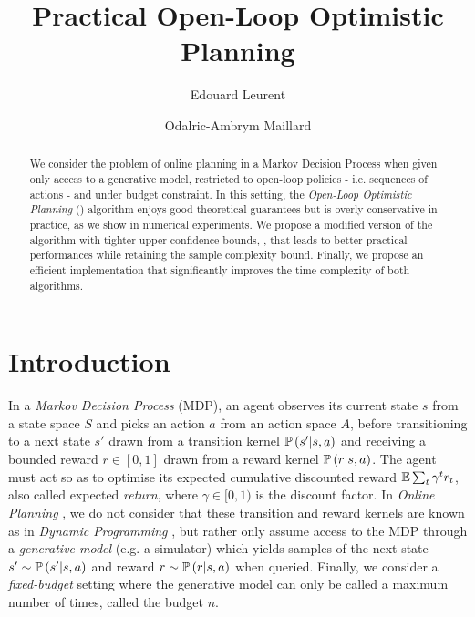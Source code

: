 \documentclass[runningheads]{llncs}
\newcommand{\citep}{\cite}
\begin{document}
%
\title{Practical Open-Loop Optimistic Planning}
%
%
\author{Edouard Leurent\and
Odalric-Ambrym Maillard}
%
%
%
\maketitle              %
%

\begin{abstract}
    We consider the problem of online planning in a Markov Decision Process when given only access to a generative model, restricted to open-loop policies - i.e. sequences of actions - and under budget constraint. In this setting, the \textit{Open-Loop Optimistic Planning} (\OLOP) algorithm enjoys good theoretical guarantees but is overly conservative in practice, as we show in numerical experiments. We propose a modified version of the algorithm with tighter upper-confidence bounds, \KLOLOP, that leads to better practical performances while retaining the sample complexity bound. Finally, we propose an efficient implementation that significantly improves the time complexity of both algorithms.
    
\end{abstract}

\section{Introduction}

In a \emph{Markov Decision Process} (MDP), an agent observes its current state $s$ from a state space $S$ and picks an action $a$ from an action space $A$, before transitioning to a next state $s'$ drawn from a transition kernel $\mathbb{P}\left(s'|s,a\right)$ and receiving a bounded reward $r\in[0, 1]$ drawn from a reward kernel $\mathbb{P}\left(r|s, a\right)$. The agent must act so as to optimise its expected cumulative discounted reward $\operatorname*{\mathbb{E}} \sum_t \gamma^t r_t$, also called expected \emph{return}, where $\gamma\in[0,1)$ is the discount factor. In \emph{Online Planning} \cite{Munos2014}, we do not consider that these transition and reward kernels are known as in \emph{Dynamic Programming} \citep{Bellman1957}, but rather only assume access to the MDP through a \emph{generative model} (e.g. a simulator) which yields samples of the next state $s' \sim \mathbb{P}\left(s'|s,a\right)$ and reward $r\sim\mathbb{P}\left(r|s, a\right)$ when queried. Finally, we consider a \emph{fixed-budget} setting where the generative model can only be called a maximum number of times, called the budget $n$. 
\end{document}
